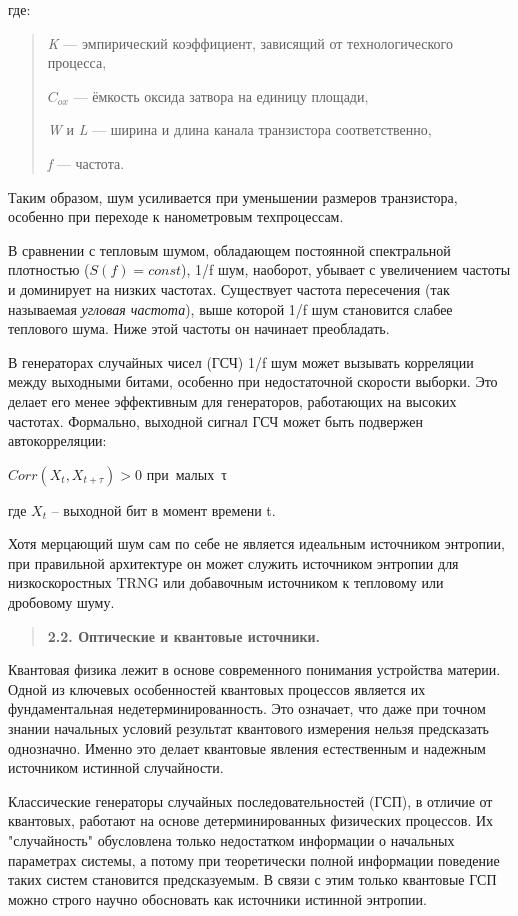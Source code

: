 где:

\begin{quote}
\emph{K} --- эмпирический коэффициент, зависящий от технологического
процесса,

\(C_{ox}\) --- ёмкость оксида затвора на единицу площади,

\emph{W} и \emph{L} --- ширина и длина канала транзистора
соответственно,

\emph{f} --- частота.
\end{quote}

Таким образом, шум усиливается при уменьшении размеров транзистора,
особенно при переходе к нанометровым техпроцессам.

В сравнении с тепловым шумом, обладающем постоянной спектральной
плотностью (\(S(f) = const\)), 1/f шум, наоборот, убывает с увеличением
частоты и доминирует на низких частотах. Существует частота пересечения
(так называемая \emph{угловая частота}), выше которой 1/f шум становится
слабее теплового шума. Ниже этой частоты он начинает преобладать.

В генераторах случайных чисел (ГСЧ) 1/f шум может вызывать корреляции
между выходными битами, особенно при недостаточной скорости выборки. Это
делает его менее эффективным для генераторов, работающих на высоких
частотах. Формально, выходной сигнал ГСЧ может быть подвержен
автокорреляции:

\(Corr(X_{t},X_{t + \tau}) > 0\) при~малых~τ

где \(X_{t}\) -- выходной бит в момент времени t.

Хотя мерцающий шум сам по себе не является идеальным источником
энтропии, при правильной архитектуре он может служить источником
энтропии для низкоскоростных TRNG или добавочным источником к тепловому
или дробовому шуму.

\begin{quote}
\textbf{2.2. Оптические и квантовые источники.}
\end{quote}

Квантовая физика лежит в основе современного понимания устройства
материи. Одной из ключевых особенностей квантовых процессов является их
фундаментальная недетерминированность. Это означает, что даже при точном
знании начальных условий результат квантового измерения нельзя
предсказать однозначно. Именно это делает квантовые явления естественным
и надежным источником истинной случайности.

Классические генераторы случайных последовательностей (ГСП), в отличие
от квантовых, работают на основе детерминированных физических процессов.
Их "случайность" обусловлена только недостатком информации о начальных
параметрах системы, а потому при теоретически полной информации
поведение таких систем становится предсказуемым. В связи с этим только
квантовые ГСП можно строго научно обосновать как источники истинной
энтропии.

